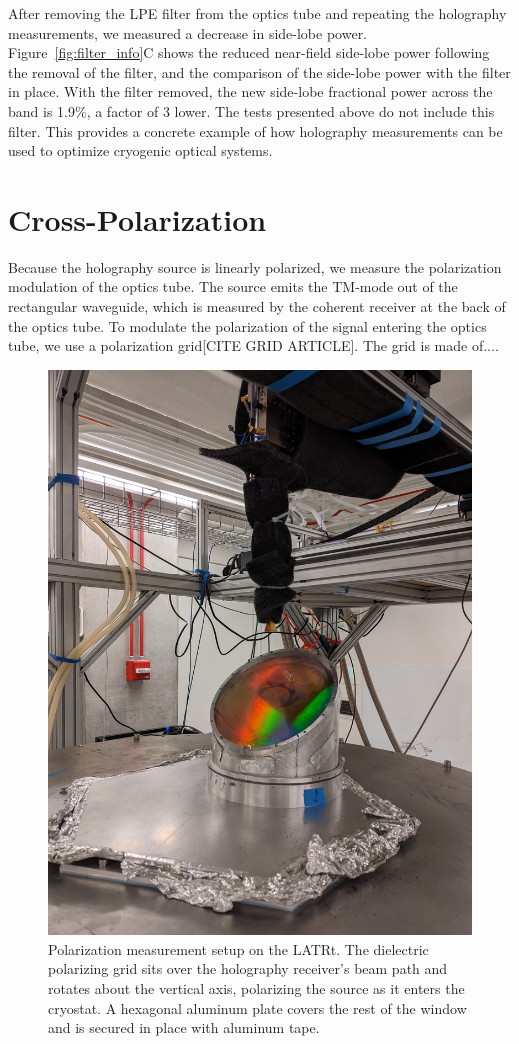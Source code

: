 After removing the LPE filter from the optics tube and repeating the holography measurements, we measured a decrease in side-lobe power.  Figure~\ref{fig:filter_info}C shows the reduced near-field side-lobe power following the removal of the filter, and the comparison of the side-lobe power with the filter in place.  With the filter removed, the new side-lobe fractional power across the band is 1.9\%, a factor of 3 lower.   The tests presented above do not include this filter.  This provides a concrete example of how holography measurements can be used to optimize cryogenic optical systems.
  
\section{Cross-Polarization}
\label{sec:crosspol}
Because the holography source is linearly polarized, we measure the polarization modulation of the optics tube.  The source emits the TM-mode out of the rectangular waveguide, which is measured by the coherent receiver at the back of the optics tube.  To modulate the polarization of the signal entering the optics tube, we use a polarization grid[CITE GRID ARTICLE].  The grid is made of.... 

\begin{figure}[t]
    \centering
    \includegraphics[width = .6\textwidth]{Figures/polgrid.jpeg}
    \caption{Polarization measurement setup on the LATRt.  The dielectric polarizing grid sits over the holography receiver's beam path and rotates about the vertical axis, polarizing the source as it enters the cryostat.  A hexagonal aluminum plate covers the rest of the window and is secured in place with aluminum tape.}
    \label{fig:polgrid_setup}
\end{figure}

